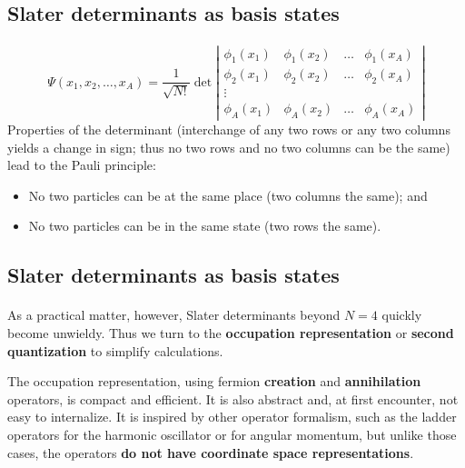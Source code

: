 \documentclass[%
twoside,                 %
final,                   %
10pt]{article}
\begin{document}
\subsection{Slater determinants as basis states}

\paragraph{}
\[
\Psi(x_1, x_2, \ldots, x_A) 
= \frac{1}{\sqrt{N!}} 
\det \left | 
\begin{array}{cccc}
\phi_1(x_1) & \phi_1(x_2) & \ldots & \phi_1(x_A) \\
\phi_2(x_1) & \phi_2(x_2) & \ldots & \phi_2(x_A) \\
 \vdots & & &  \\
\phi_A(x_1) & \phi_A(x_2) & \ldots & \phi_A(x_A) 
\end{array}
\right |
\]
Properties of the determinant (interchange of any two rows or 
any two columns yields a change in sign; thus no two rows and no 
two columns can be the same) lead to the Pauli principle:

\begin{itemize}
\item No two particles can be at the same place (two columns the same); and

\item No two particles can be in the same state (two rows the same).
\end{itemize}

\noindent




\subsection{Slater determinants as basis states}

\paragraph{}
As a practical matter, however, Slater determinants beyond $N=4$ quickly become 
unwieldy. Thus we turn to the \textbf{occupation representation} or \textbf{second quantization} to simplify calculations. 

The occupation representation, using fermion \textbf{creation} and \textbf{annihilation} 
operators, is compact and efficient. It is also abstract and, at first encounter, not easy to 
internalize. It is inspired by other operator formalism, such as the ladder operators for 
the harmonic oscillator or for angular momentum, but unlike those cases, the operators \textbf{do not have coordinate space representations}.
\end{document}
